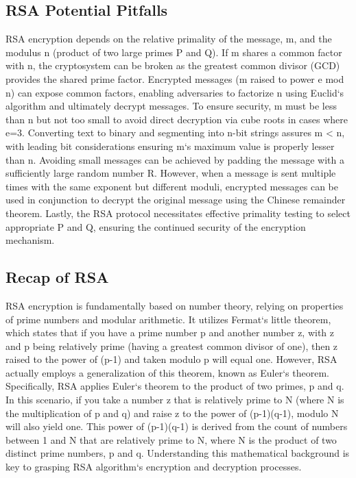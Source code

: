 \subsection*{RSA  Potential Pitfalls}
RSA encryption depends on the relative primality of the message, m, and the modulus n (product of two large primes P and Q).
If m shares a common factor with n, the cryptosystem can be broken as the greatest common divisor (GCD) provides the shared prime factor.
Encrypted messages (m raised to power e mod n) can expose common factors, enabling adversaries to factorize n using Euclid`s algorithm and ultimately decrypt messages.
To ensure security, m must be less than n but not too small to avoid direct decryption via cube roots in cases where e=3.
Converting text to binary and segmenting into n-bit strings assures m \textless{} n, with leading bit considerations ensuring m`s maximum value is properly lesser than n.
Avoiding small messages can be achieved by padding the message with a sufficiently large random number R\@.
However, when a message is sent multiple times with the same exponent but different moduli, encrypted messages can be used in conjunction to decrypt the original message using the Chinese remainder theorem.
Lastly, the RSA protocol necessitates effective primality testing to select appropriate P and Q, ensuring the continued security of the encryption mechanism.

\subsection*{Recap of RSA}
RSA encryption is fundamentally based on number theory, relying on properties of prime numbers and modular arithmetic.
It utilizes Fermat`s little theorem, which states that if you have a prime number p and another number z, with z and p being relatively prime (having a greatest common divisor of one), then z raised to the power of (p-1) and taken modulo p will equal one.
However, RSA actually employs a generalization of this theorem, known as Euler`s theorem.
Specifically, RSA applies Euler`s theorem to the product of two primes, p and q.
In this scenario, if you take a number z that is relatively prime to N (where N is the multiplication of p and q) and raise z to the power of (p-1)(q-1), modulo N will also yield one.
This power of (p-1)(q-1) is derived from the count of numbers between 1 and N that are relatively prime to N, where N is the product of two distinct prime numbers, p and q.
Understanding this mathematical background is key to grasping RSA algorithm`s encryption and decryption processes.

